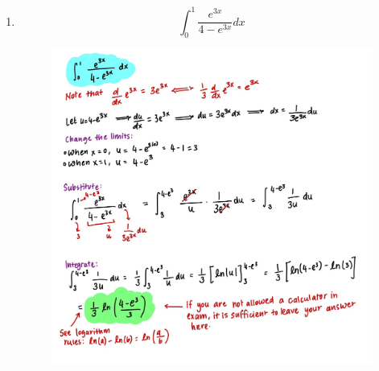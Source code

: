 \documentclass{article}
\begin{document}
\begin{enumerate}
\begin{figure}[H]
        \label{fig:Q1.3}
    \end{figure} 
    \item $$\int_0^1{\frac{e^{3x}}{4-e^{3x}}}dx$$
    \begin{figure}[H]
        \centering
        \includegraphics[width=0.6\linewidth]{Q1.4.jpg}
        \label{fig:Q1.4}
    \end{figure} 
\end{enumerate}
\end{document}
